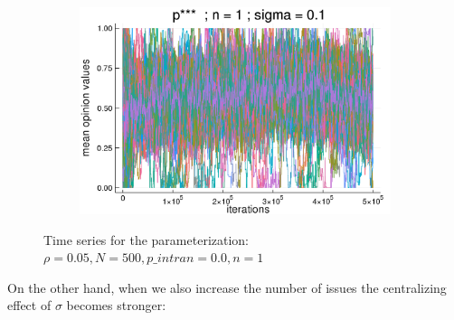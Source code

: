 \documentclass{article}
\begin{document}
\begin{figure}[H]
\begin{subfigure}[b]{0.5\textwidth}
       \includegraphics[width=\textwidth]{img/compare-ps/Poodlcalculatep***n1-rho005-sigma01-00intrans.png}
     \end{subfigure}
     \caption{Time series for the parameterization: \(\rho = 0.05, N = 500,
       p\_intran = 0.0, n  = 1 \)}
      \label{fig:tseries1}
    \end{figure}

    On the other hand, when we also increase the number of issues the
    centralizing effect of \(\sigma \) becomes stronger:
\end{document}
